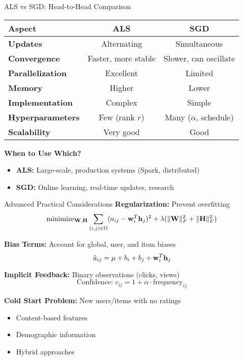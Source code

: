 \documentclass{beamer}
\begin{document}
\begin{frame}{ALS vs SGD: Head-to-Head Comparison}
\begin{center}
\renewcommand{\arraystretch}{1.4}
\begin{tabular}{l|cc}
\toprule
\textbf{Aspect} & \textbf{ALS} & \textbf{SGD} \\
\midrule
\textbf{Updates} & Alternating & Simultaneous \\
\textbf{Convergence} & Faster, more stable & Slower, can oscillate \\
\textbf{Parallelization} & Excellent & Limited \\
\textbf{Memory} & Higher & Lower \\
\textbf{Implementation} & Complex & Simple \\
\textbf{Hyperparameters} & Few (rank $r$) & Many ($\alpha$, schedule) \\
\textbf{Scalability} & Very good & Good \\
\bottomrule
\end{tabular}
\end{center}

\pause
\textbf{When to Use Which?}
\begin{itemize}[<+->]
    \item \textbf{ALS:} Large-scale, production systems (Spark, distributed)
    \item \textbf{SGD:} Online learning, real-time updates, research
\end{itemize}
\end{frame}

\begin{frame}{Advanced Practical Considerations}
\textbf{Regularization:} Prevent overfitting
\begin{equation*}
\operatorname{minimize}_{\mathbf{W},\mathbf{H}} \sum_{(i,j) \in \Omega} (a_{ij} - \mathbf{w}_i^T \mathbf{h}_j)^2 + \lambda(\|\mathbf{W}\|_F^2 + \|\mathbf{H}\|_F^2)
\end{equation*}

\pause
\textbf{Bias Terms:} Account for global, user, and item biases
\begin{equation*}
\hat{a}_{ij} = \mu + b_i + b_j + \mathbf{w}_i^T \mathbf{h}_j
\end{equation*}

\pause
\textbf{Implicit Feedback:} Binary observations (clicks, views)
\begin{equation*}
\text{Confidence: } c_{ij} = 1 + \alpha \cdot \text{frequency}_{ij}
\end{equation*}

\pause
\textbf{Cold Start Problem:} New users/items with no ratings
\begin{itemize}[<+->]
    \item Content-based features
    \item Demographic information  
    \item Hybrid approaches
\end{itemize}
\end{frame}
\end{document}
